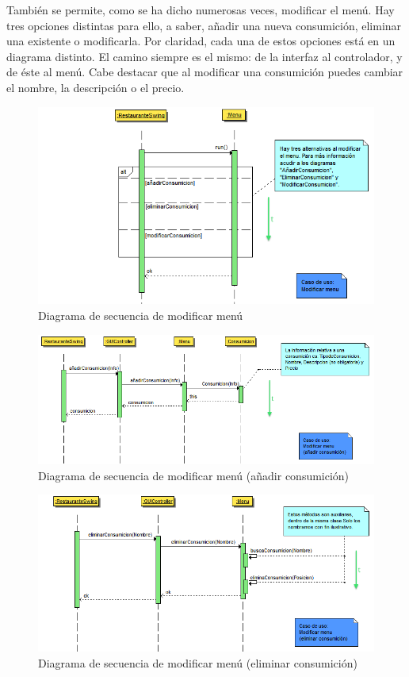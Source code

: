 \documentclass[spanish,a4paper,11pt, twoside]{report}	%
\begin{document}
		También se permite, como se ha dicho numerosas veces, modificar el menú. Hay tres opciones distintas para ello, a saber, añadir una nueva consumición, eliminar una existente o modificarla. Por claridad, cada una de estos opciones está en un diagrama distinto. El camino siempre es el mismo: de la interfaz al controlador, y de éste al menú. Cabe destacar que al modificar una consumición puedes cambiar el nombre, la descripción o el precio.
		\begin{figure}[!h]
		\centering
		\includegraphics[scale=0.5]{DSmodificarmenu.png}
		\caption{Diagrama de secuencia de modificar menú}
		\end{figure}		

		\begin{figure}[!h]
		\centering
		\includegraphics[scale=0.5]{DSanyadirconsumicion.png}
		\caption{Diagrama de secuencia de modificar menú (añadir consumición)}
		\end{figure}

		\begin{figure}[!h]
		\centering
		\includegraphics[scale=0.5]{DSeliminarconsumicion.png}
		\caption{Diagrama de secuencia de modificar menú (eliminar consumición)}
		\end{figure}
\end{document}
